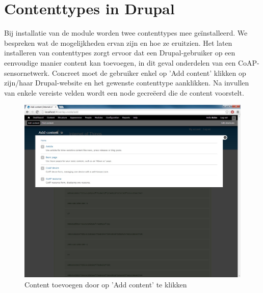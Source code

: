 \newpage
\section{Contenttypes in Drupal}

Bij installatie van de module worden twee contenttypes mee ge\"{i}nstalleerd. We bespreken wat de mogelijkheden ervan zijn en hoe ze eruitzien. Het laten installeren van contenttypes zorgt ervoor dat een Drupal-gebruiker op een eenvoudige manier content kan toevoegen, in dit geval onderdelen van een CoAP-sensornetwerk. Concreet moet de gebruiker enkel op 'Add content' klikken op zijn/haar Drupal-website en het gewenste contenttype aanklikken. Na invullen van enkele vereiste velden wordt een node gecre\"{e}erd die de content voorstelt.
\begin{figure}[h!]
\vspace{10pt}
\centering
\includegraphics[width=1\textwidth]{fig/add_content}
\caption{Content toevoegen door op 'Add content' te klikken}
\label{fig:addContent}
\end{figure}

\newpage
